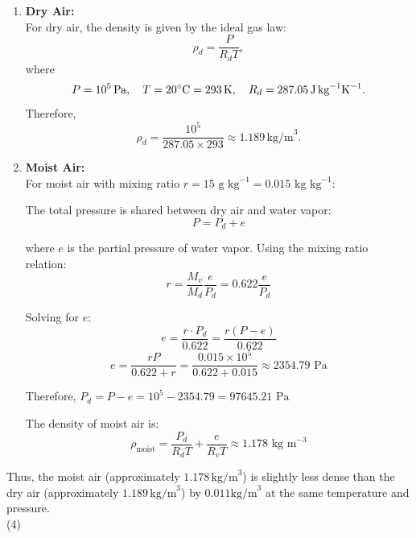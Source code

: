 \documentclass[letterpaper, 11pt]{article}
\newcommand{\1}{\mathds{1}}	%
\theoremstyle{definition}
\begin{document}
\begin{enumerate}[label=(\alph*)]
  \item \textbf{Dry Air:} \\
  For dry air, the density is given by the ideal gas law:
  \[
  \rho_d = \frac{P}{R_d T},
  \]
  where 
  \[
  P = 10^5\,\text{Pa}, \quad T = 20^\circ\text{C} = 293\,\text{K}, \quad R_d = 287.05\,\text{J\,kg}^{-1}\text{K}^{-1}.
  \]
  Therefore,
  \[
  \rho_d = \frac{10^5}{287.05 \times 293} \approx 1.189\,\text{kg/m}^3.
  \]

  \item \textbf{Moist Air:} \\
 For moist air with mixing ratio $r = 15\text{ g kg}^{-1} = 0.015\text{ kg kg}^{-1}$:
    
    The total pressure is shared between dry air and water vapor:
    \begin{equation*}
    P = P_d + e
    \end{equation*}
    
    where $e$ is the partial pressure of water vapor. Using the mixing ratio relation:
    \begin{equation*}
    r = \frac{M_v}{M_d} \frac{e}{P_d} = 0.622 \frac{e}{P_d}
    \end{equation*}
    
    Solving for $e$:
    \begin{equation*}
    e = \frac{r \cdot P_d}{0.622} = \frac{r(P - e)}{0.622}
    \end{equation*}
    \begin{equation*}
    e = \frac{rP}{0.622 + r} = \frac{0.015 \times 10^5}{0.622 + 0.015} \approx 2354.79\text{ Pa}
    \end{equation*}
    
    Therefore, $P_d = P - e = 10^5 - 2354.79 = 97645.21\text{ Pa}$
    
    The density of moist air is:
    \begin{equation*}
    \rho_{\text{moist}} = \frac{P_d}{R_d T} + \frac{e}{R_v T} \approx 1.178\text{ kg m}^{-3}
    \end{equation*}
    
  \end{enumerate}
  Thus, the moist air (approximately \(1.178\,\text{kg/m}^3\)) is slightly less dense than the dry air (approximately \(1.189\,\text{kg/m}^3\)) by \(0.011\text{kg/m}^3\) at the same temperature and pressure.
  \\(4)
\end{document}
